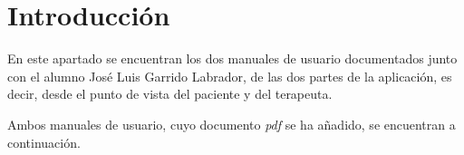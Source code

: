 
\section{Introducción}

En este apartado se encuentran los dos manuales de usuario documentados junto con el alumno José Luis Garrido Labrador, de las dos partes de la aplicación, es decir, desde el punto de vista del paciente y del terapeuta.

Ambos manuales de usuario, cuyo documento \textit{pdf} se ha añadido, se encuentran a continuación.



